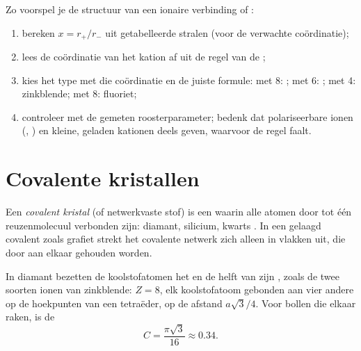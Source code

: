\begin{method}\label{met:b1:crystals-ionic-covalent:predict}
Zo voorspel je de structuur van een ionaire verbinding  of
:
\begin{enumerate}
  \item bereken $x = r_+/r_-$ uit getabelleerde stralen (voor de
        verwachte coördinatie);
  \item lees de coördinatie van het kation af uit de regel van de
        ;
  \item kies het type met die coördinatie en de juiste formule:
         met 8: ; met 6: ; met 4: zinkblende;
         met 8: fluoriet;
  \item controleer met de gemeten roosterparameter; bedenk dat
        polariseerbare ionen (, ) en kleine, geladen
        kationen deels  geven, waarvoor de regel
        faalt.
\end{enumerate}
\end{method}

\section{Covalente kristallen}

\begin{definition}\label{def:b1:crystals-ionic-covalent:covalent-crystal}
Een \emph{covalent kristal} (of netwerkvaste
stof) is een  waarin alle atomen door  tot één
reuzenmolecuul verbonden zijn: diamant, silicium, kwarts . In een
gelaagd covalent  zoals grafiet strekt het covalente netwerk zich
alleen in vlakken uit, die door  aan elkaar
gehouden worden.
\end{definition}

\begin{proposition}[De diamantstructuur]\label{prop:b1:crystals-ionic-covalent:diamond}
In diamant bezetten de koolstofatomen het  en de helft van zijn
, zoals de twee soorten ionen van zinkblende:
$Z = 8$, elk koolstofatoom gebonden aan vier andere op de hoekpunten van
een tetraëder, op de afstand $a\sqrt3/4$. Voor bollen die elkaar raken,
is de 
\[
  C = \frac{\pi\sqrt3}{16} \approx 0.34 .
\]
\end{proposition}


